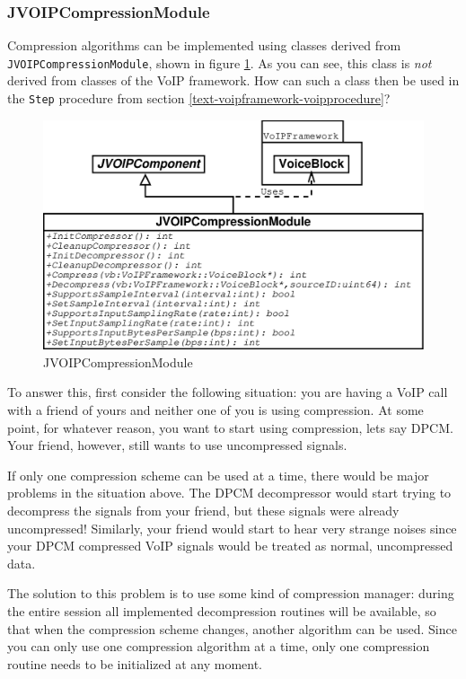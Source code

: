 			\subsubsection{JVOIPCompressionModule}
			
			Compression algorithms can be implemented using classes derived from
			{\tt JVOIP\-Compression\-Module}, shown in figure \ref{class-jvoipcompressionmodule}.
			As you can see, this class is {\em not} derived from classes of the
			VoIP framework. How can such a class then be used in the {\tt Step} procedure
			from section \ref{text-voipframework-voipprocedure}?
			\begin{figure}
				\center
				\includegraphics[width=\linewidth]{images/manual/chapter2/class-jvoipcompressionmodule.eps}
				\caption{JVOIPCompressionModule}
				\label{class-jvoipcompressionmodule}
			\end{figure}
			
			To answer this, first consider the following situation: you are having
			a VoIP call with a friend of yours and neither one of you is using
			compression. At some point, for whatever reason, you want to start using
			compression, lets say DPCM. Your friend, however, still wants to use
			uncompressed signals.
			
			If only one compression scheme can be used at a time, there would be major
			problems in the situation above. The DPCM decompressor would start trying
			to decompress the signals from your friend, but these signals were already
			uncompressed! Similarly, your friend would start to hear very strange noises
			since your DPCM compressed VoIP signals would be treated as normal, 
			uncompressed data.
			
			The solution to this problem is to use some kind of compression manager:
			during the entire session all implemented decompression routines will be
			available, so that when the compression scheme changes, another algorithm
			can be used. Since you can only use one compression algorithm at a time,
			only one compression routine needs to be initialized at any moment.
			
